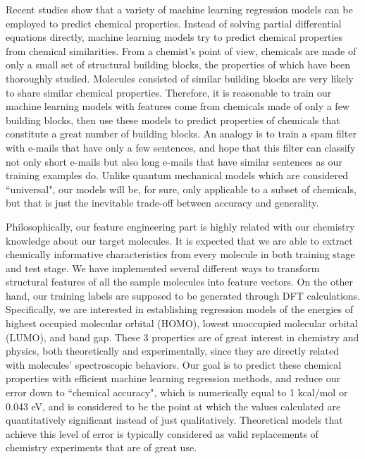 \documentclass[10pt, oneside]{article}   	%
\begin{document}
Recent studies show that a variety of machine learning regression models can be employed to predict chemical properties. Instead of solving partial differential equations directly, machine learning models try to predict chemical properties from chemical similarities. From a chemist's point of view, chemicals are made of only a small set of structural building blocks, the properties of which have been thoroughly studied. Molecules consisted of similar building blocks are very likely to share similar chemical properties. Therefore, it is reasonable to train our machine learning models with features come from chemicals made of only a few building blocks, then use these models to predict properties of chemicals that constitute a great number of building blocks. An analogy is to train a spam filter with e-mails that have only a few sentences, and hope that this filter can classify not only short e-mails but also long e-mails that have similar sentences as our training examples do. Unlike quantum mechanical models which are considered ``universal", our models will be, for sure, only applicable to a subset of chemicals, but that is just the inevitable trade-off between accuracy and generality.

Philosophically, our feature engineering part is highly related with our chemistry knowledge about our target molecules. It is expected that we are able to extract chemically informative characteristics from every molecule in both training stage and test stage. We have implemented several different ways to transform structural features of all the sample molecules into feature vectors. On the other hand, our training labels are supposed to be generated through DFT calculations. Specifically, we are interested in establishing regression models of the energies of highest occupied molecular orbital (HOMO), lowest unoccupied molecular orbital (LUMO), and band gap. These 3 properties are of great interest in chemistry and physics, both theoretically and experimentally, since they are directly related with molecules' spectroscopic behaviors\cite{hc}. Our goal is to predict these chemical properties with efficient machine learning regression methods, and reduce our error down to ``chemical accuracy", which is numerically equal to 1 kcal/mol or 0.043 eV, and is considered to be the point at which the values calculated are quantitatively significant instead of just qualitatively. Theoretical models that achieve this level of error is typically considered as valid replacements of chemistry experiments that are of great use.
\end{document}
